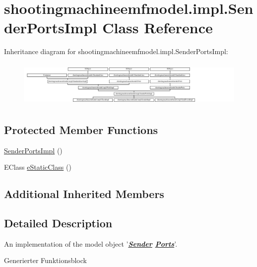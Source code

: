 \hypertarget{classshootingmachineemfmodel_1_1impl_1_1_sender_ports_impl}{\section{shootingmachineemfmodel.\-impl.\-Sender\-Ports\-Impl Class Reference}
\label{classshootingmachineemfmodel_1_1impl_1_1_sender_ports_impl}
}
Inheritance diagram for shootingmachineemfmodel.\-impl.\-Sender\-Ports\-Impl\-:\begin{figure}[H]
\begin{center}
\leavevmode
\includegraphics[height=2.247492cm]{classshootingmachineemfmodel_1_1impl_1_1_sender_ports_impl}
\end{center}
\end{figure}
\subsection*{Protected Member Functions}
\begin{DoxyCompactItemize}
\item 
\hyperlink{classshootingmachineemfmodel_1_1impl_1_1_sender_ports_impl_a142b3bb72731cd283f8bcb55ac57566a}{Sender\-Ports\-Impl} ()
\item 
E\-Class \hyperlink{classshootingmachineemfmodel_1_1impl_1_1_sender_ports_impl_a8310f5ad1e52ffc9a155e304d9215556}{e\-Static\-Class} ()
\end{DoxyCompactItemize}
\subsection*{Additional Inherited Members}


\subsection{Detailed Description}
An implementation of the model object '{\itshape {\bfseries \hyperlink{interfaceshootingmachineemfmodel_1_1_sender}{Sender} \hyperlink{interfaceshootingmachineemfmodel_1_1_ports}{Ports}}}'.

Generierter Funktionsblock 

